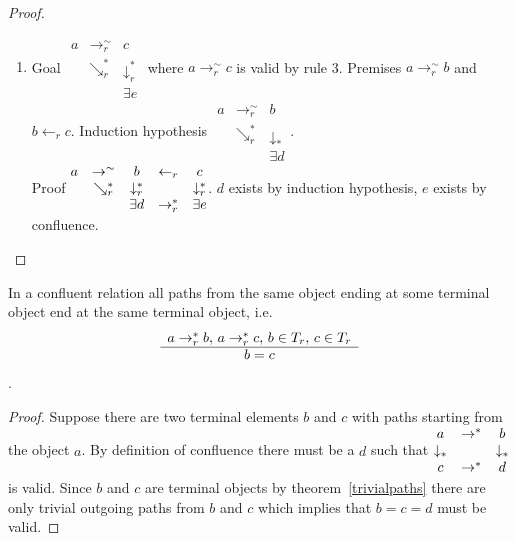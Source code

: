 \begin{theorem}
\begin{proof}
\begin{enumerate}
    \item
      Goal
      $\begin{matrix}
        a    & \to_r^\sim      & c                      \\
              & \searrow_r^* & \downarrow_r^*  \\
        & & \exists e
      \end{matrix}$
      where $a \to_r^\sim c$ is valid by rule 3. Premises $a \to_r^\sim b$
      and $b \gets_r c$.
      Induction hypothesis
      $\begin{matrix}
        a    & \to_r^\sim      & b                      \\
              & \searrow_r^* & \downarrow_*  \\
        & & \exists d
      \end{matrix}$.\\
      Proof
      $\begin{matrix}
        a & \to^\sim & b & \gets_r & c\\
        & \searrow_r^* & \downarrow_r^*  & & \downarrow_r^*\\
        & & \exists d & \to_r^* & \exists e
      \end{matrix}$.
      $d$ exists by induction hypothesis, $e$ exists by confluence.
    \end{enumerate}
  \end{proof}
\end{theorem}


\begin{theorem}
  In a confluent relation all paths from the same object ending at some terminal
  object end at the same terminal object, i.e.
  $$\begin{array}{c} a \to_r^* b, \, a \to_r^* c, \, b \in T_r, \, c \in T_r \\ \hline b = c\end{array}$$.

  \begin{proof}
    Suppose there are two terminal elements $b$ and $c$ with paths starting
    from the object $a$.
    By definition of confluence there must be a $d$ such that
    $\begin{matrix} a & \to^* & b \\
      \downarrow_* & & \downarrow_* \\
      c & \to^* & d
    \end{matrix}$ is valid. Since $b$ and $c$ are terminal objects by
    theorem~\ref{trivialpaths} there are only trivial outgoing paths from $b$
    and $c$ which implies that $b = c = d$ must be valid.
  \end{proof}
\end{theorem}



